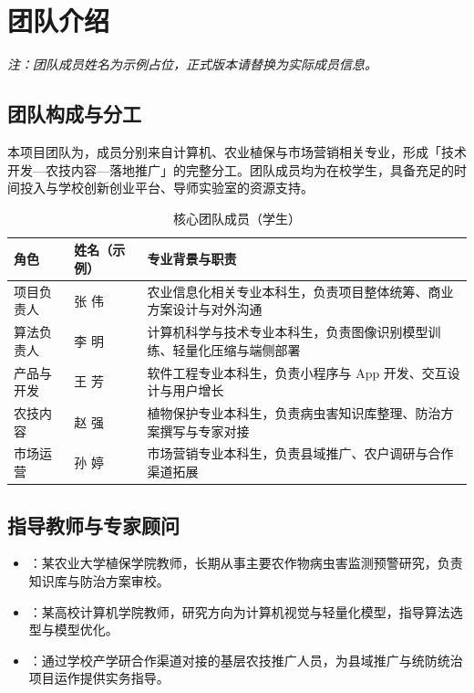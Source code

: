 \chapter{团队介绍}

\noindent\textit{\small 注：团队成员姓名为示例占位，正式版本请替换为实际成员信息。}

\section{团队构成与分工}

本项目团队为，成员分别来自计算机、农业植保与市场营销相关专业，形成「技术开发—农技内容—落地推广」的完整分工。团队成员均为在校学生，具备充足的时间投入与学校创新创业平台、导师实验室的资源支持。

\begin{table}[H]
  \centering
  \small
  \renewcommand{\arraystretch}{1.4}
  \caption{核心团队成员（学生）}
  \begin{tabular}{p{2.6cm}p{3.4cm}p{8.2cm}}
    \toprule
    角色 & 姓名（示例） & 专业背景与职责 \\
    \midrule
    项目负责人 & 张 伟 & 农业信息化相关专业本科生，负责项目整体统筹、商业方案设计与对外沟通 \\
    算法负责人 & 李 明 & 计算机科学与技术专业本科生，负责图像识别模型训练、轻量化压缩与端侧部署 \\
    产品与开发 & 王 芳 & 软件工程专业本科生，负责小程序与 App 开发、交互设计与用户增长 \\
    农技内容 & 赵 强 & 植物保护专业本科生，负责病虫害知识库整理、防治方案撰写与专家对接 \\
    市场运营 & 孙 婷 & 市场营销专业本科生，负责县域推广、农户调研与合作渠道拓展 \\
    \bottomrule
  \end{tabular}
\end{table}

\section{指导教师与专家顾问}

\begin{itemize}[leftmargin=1.6em]
  \item {}：某农业大学植保学院教师，长期从事主要农作物病虫害监测预警研究，负责知识库与防治方案审校。
  \item {}：某高校计算机学院教师，研究方向为计算机视觉与轻量化模型，指导算法选型与模型优化。
  \item {}：通过学校产学研合作渠道对接的基层农技推广人员，为县域推广与统防统治项目运作提供实务指导。
\end{itemize}

